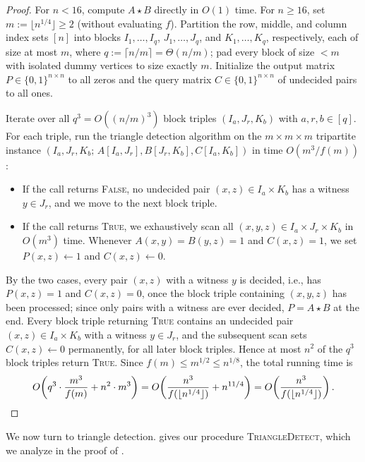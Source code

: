 \documentclass[11pt]{article}
\theoremstyle{definition}
\newcommand{\TriangleDetect}{\textnormal{\textsc{TriangleDetect}}}
\begin{document}
\begin{proof}
For $n < 16$, compute $A \star B$ directly in $O(1)$ time. For $n \ge 16$, set $m := \lfloor n^{1/4} \rfloor \ge 2$ (without evaluating $f$). Partition the row, middle, and column index sets $[n]$ into blocks $I_1, \dots, I_q$, $J_1, \dots, J_q$, and $K_1, \dots, K_q$, respectively, each of size at most $m$, where $q := \lceil n/m \rceil = \Theta(n/m)$; pad every block of size $< m$ with isolated dummy vertices to size exactly $m$. Initialize the output matrix $P \in \{0, 1\}^{n \times n}$ to all zeros and the query matrix $C \in \{0, 1\}^{n \times n}$ of undecided pairs to all ones.

Iterate over all $q^3 = O((n/m)^3)$ block triples $(I_a, J_r, K_b)$ with $a, r, b \in [q]$. For each triple, run the triangle detection algorithm on the $m \times m \times m$ tripartite instance $(I_a, J_r, K_b; \, A[I_a, J_r], B[J_r, K_b], C[I_a, K_b])$ in time $O(m^3 / f(m))$:
\begin{itemize}[leftmargin=*]
    \item If the call returns \textsc{False}, no undecided pair $(x, z) \in I_a \times K_b$ has a witness $y \in J_r$, and we move to the next block triple.
    \item If the call returns \textsc{True}, we exhaustively scan all $(x, y, z) \in I_a \times J_r \times K_b$ in $O(m^3)$ time. Whenever $A(x, y) = B(y, z) = 1$ and $C(x, z) = 1$, we set $P(x, z) \gets 1$ and $C(x, z) \gets 0$.
\end{itemize}
By the two cases, every pair $(x, z)$ with a witness $y$ is decided, i.e., has $P(x, z) = 1$ and $C(x, z) = 0$, once the block triple containing $(x, y, z)$ has been processed; since only pairs with a witness are ever decided, $P = A \star B$ at the end. Every block triple returning \textsc{True} contains an undecided pair $(x, z) \in I_a \times K_b$ with a witness $y \in J_r$, and the subsequent scan sets $C(x, z) \gets 0$ permanently, for all later block triples. Hence at most $n^2$ of the $q^3$ block triples return \textsc{True}. Since $f(m) \le m^{1/2} \le n^{1/8}$, the total running time is
\[
    O\!\left(q^3 \cdot \frac{m^3}{f(m)} + n^2 \cdot m^3\right) = O\!\left(\frac{n^3}{f(\lfloor n^{1/4} \rfloor)} + n^{11/4}\right) = O\!\left(\frac{n^3}{f(\lfloor n^{1/4} \rfloor)}\right). \qedhere
\]
\end{proof}

We now turn to triangle detection.  gives our procedure \TriangleDetect{}, which we analyze in the proof of .
\end{document}
